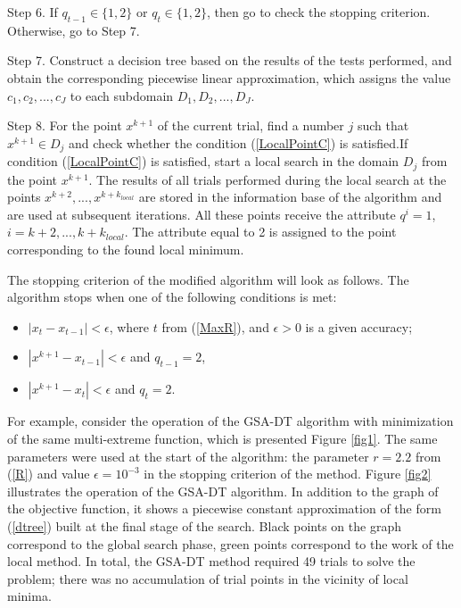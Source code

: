 \documentclass[entropy,article,submit,moreauthors,pdftex]{Definitions/mdpi}
\begin{document}
Step 6. If $q_{t-1} \in \{1,2\}$ or $q_t \in \{1,2\}$, then go to check the stopping criterion. Otherwise, go to Step 7.

Step 7. Construct a decision tree based on the results of the tests performed, and obtain the corresponding piecewise linear approximation, which assigns the value $c_1, c_2, ..., c_J$ to each subdomain  $D_1, D_2, ..., D_J$.

Step 8. For the point $x^{k+1}$ of the current trial, find a number $j$ such that $x^{k+1} \in D_j$ and check whether the condition  (\ref{LocalPointC}) is satisfied.If condition (\ref{LocalPointC}) is satisfied, start a local search in the domain $D_j$ from the point  $x^{k+1}$. 
The results of all trials performed during the local search at the points $x^{k+2}, ...,x^{k+k_{local}}$ are stored in the information base of the algorithm and are used at subsequent iterations. 
All these points receive the attribute  $q^i=1$, $i = k+2, ... , k+k_{local}$. The attribute equal to 2 is assigned to the point corresponding to the found local minimum.

The stopping criterion of the modified algorithm will look as follows. 
The algorithm stops when one of the following conditions is met:

\begin{itemize}
	\item $|x_{t} - x_{t-1}|<\epsilon$, where $t$ from (\ref{MaxR}), and $\epsilon>0$ is a given accuracy;
	\item $|x^{k+1} - x_{t-1}|<\epsilon$ and $q_{t-1} = 2$,
	\item $|x^{k+1}-x_{t}|<\epsilon$ and $q_{t} = 2$.
\end{itemize}


For example, consider the operation of the GSA-DT algorithm with minimization of the same multi-extreme function, which is presented  Figure \ref{fig1}. The same parameters were used at the start of the algorithm: the parameter  $r=2.2$ from (\ref{R}) and value $\epsilon = 10^{-3}$ in the stopping criterion of the method. 
Figure \ref{fig2} illustrates the operation of the GSA-DT algorithm. In addition to the graph of the objective function, it shows a piecewise constant approximation of the form (\ref{dtree}) built at the final stage of the search. Black points on the graph correspond to the global search phase, green points correspond to the work of the local method. In total, the GSA-DT method required 49 trials to solve the problem; there was no accumulation of trial points in the vicinity of local minima.
 
\end{document}
